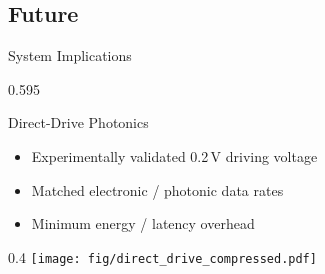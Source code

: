 
\subsection{Future}

\begin{frame}{System Implications}

    \lrlSideBySide%
    {0.595}{%
        \begin{block}{Direct-Drive Photonics}
            \begin{itemize}
                \item Experimentally validated 0.2\,V driving voltage
                \item Matched electronic / photonic data rates
                \item Minimum energy / latency overhead
            \end{itemize}
        \end{block}
        \vspace{1em}
    }%
    {0.4}{%
        \texttt{[image: fig/direct\_drive\_compressed.pdf]}%
    }

\end{frame}
